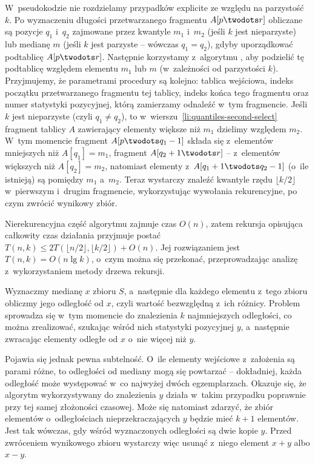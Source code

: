W~pseudokodzie nie rozdzielamy przypadków explicite ze względu na parzystość $k$. Po wyznaczeniu długości przetwarzanego fragmentu $A[p\twodots r]$ obliczane są pozycje $q_1$ i~$q_2$ zajmowane przez kwantyle $m_1$ i~$m_2$ (jeśli $k$ jest nieparzyste) lub medianę $m$ (jeśli $k$ jest parzyste -- wówczas $q_1=q_2$), gdyby uporządkować podtablicę $A[p\twodots r]$. Następnie korzystamy z~algorytmu , aby podzielić tę podtablicę względem elementu $m_1$ lub $m$ (w~zależności od parzystości $k$). Przyjmujemy, że parametrami procedury  są kolejno: tablica wejściowa, indeks początku przetwarzanego fragmentu tej tablicy, indeks końca tego fragmentu oraz numer statystyki pozycyjnej, którą zamierzamy odnaleźć w~tym fragmencie. Jeśli $k$ jest nieparzyste (czyli $q_1\ne q_2$), to w~wierszu~\ref{li:quantiles-second-select} fragment tablicy $A$ zawierający elementy większe niż $m_1$ dzielimy względem $m_2$. W~tym momencie fragment $A[p\twodots q_1-1]$ składa się z~elementów mniejszych niż $A[q_1]=m_1$, fragment $A[q_2+1\twodots r]$ -- z~elementów większych niż $A[q_2]=m_2$, natomiast elementy z~$A[q_1+1\twodots q_2-1]$ (o~ile istnieją) są pomiędzy $m_1$ a~$m_2$. Teraz wystarczy znaleźć kwantyle rzędu $\lfloor k/2\rfloor$ w~pierwszym i~drugim fragmencie, wykorzystując wywołania rekurencyjne, po czym zwrócić wynikowy zbiór.

Nierekurencyjna część algorytmu zajmuje czas $O(n)$, zatem rekursja opisująca całkowity czas działania przyjmuje postać $T(n,k)\le2T(\lfloor n/2\rfloor,\lfloor k/2\rfloor)+O(n)$. Jej rozwiązaniem jest $T(n,k)=O(n\lg k)$, o~czym można się przekonać, przeprowadzając analizę z~wykorzystaniem metody drzewa rekursji.

\exercise %
Wyznaczmy medianę $x$ zbioru $S$, a~następnie dla każdego elementu z~tego zbioru obliczmy jego odległość od $x$, czyli wartość bezwzględną z~ich różnicy. Problem sprowadza się w~tym momencie do znalezienia $k$ najmniejszych odległości, co można zrealizować, szukając wśród nich  statystyki pozycyjnej $y$, a~następnie zwracając elementy odległe od $x$ o~nie więcej niż $y$.

Pojawia się jednak pewna subtelność. O~ile elementy wejściowe z~założenia są parami różne, to odległości od mediany mogą się powtarzać -- dokładniej, każda odległość może występować w~co najwyżej dwóch egzemplarzach. Okazuje się, że algorytm  wykorzystywany do znalezienia $y$ działa w~takim przypadku poprawnie przy tej samej złożoności czasowej. Może się natomiast zdarzyć, że zbiór elementów o~odległościach nieprzekraczających $y$ będzie mieć $k+1$ elementów. Jest tak wówczas, gdy wśród wyznaczonych odległości są dwie kopie $y$. Przed zwróceniem wynikowego zbioru wystarczy więc usunąć z~niego element $x+y$ albo $x-y$.

